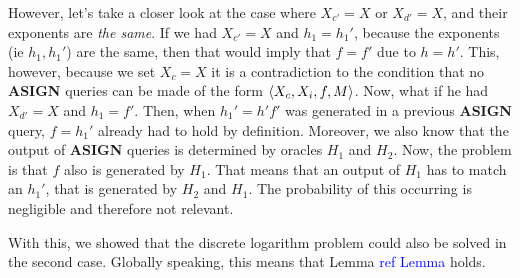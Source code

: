 However, let's take a closer look at the case where \(X_{c'} = X\) or \(X_{d'} = X\), and their exponents are \textit{the same}.
If we had \(X_{c'} = X\) and \(h_1 = h_1'\), because the exponents (ie \(h_1, h_1'\)) are the same, then that would imply that \(f = f'\) due to \(h = h'\).
This, however, because we set \(X_c = X\) it is a contradiction to the condition that no \textbf{ASIGN} queries can be made of the form \(\langle X_c, X_i, f, M \rangle\).
Now, what if he had \(X_{d'} = X\) and \(h_1 = f'\).
Then, when \(h_1' = h'  f'\) was generated in a previous \textbf{ASIGN} query, \(f = h_1'\) already had to hold by definition.
Moreover, we also know that the output of \textbf{ASIGN} queries is determined by oracles \(H_1\) and \(H_2\).
Now, the problem is that \(f\) also is generated by \(H_1\). That means that an output of \(H_1\) has to match an \(h_1'\), that is generated by \(H_2\) and \(H_1\).
The probability of this occurring is negligible and therefore not relevant. 

With this, we showed that the discrete logarithm problem could also be solved in the second case.
Globally speaking, this means that Lemma \textcolor{blue}{ref Lemma} holds.
